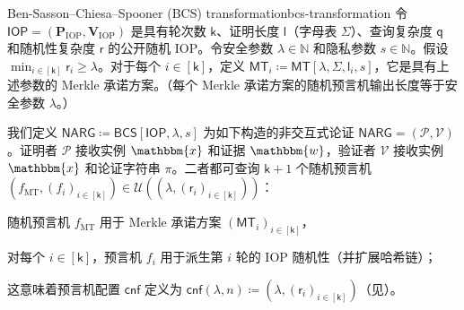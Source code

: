 \documentclass[american,singlepageview]{snargs-book-zh}
\newcommand{\DefineEqual}{\coloneqq}
\newcommand{\Naturals}{\mathbb{N}}
\newcommand{\Instance}{\mathbbm{x}}
\newcommand{\Witness}{\mathbbm{w}}
\newcommand{\InstanceSize}{n}
\newcommand{\ProtoProver}{P}
\newcommand{\ProtoVerifier}{V}
\newcommand{\ProtoAlphabet}{\Sigma}
\newcommand{\ProtoRoundComplexity}{\mathsf{k}}
\newcommand{\ProtoProofLength}{\mathsf{l}}
\newcommand{\ProtoQueryComplexity}{\mathsf{q}}
\newcommand{\ProtoRandomnessComplexity}{\mathsf{r}}
\newcommand{\RoundIndex}{i}
\newcommand{\IOPSymbol}{\mathsf{IOP}}
\newcommand{\IOPSubscript}{\scriptscriptstyle\mathrm{IOP}}
\newcommand{\IOPFormat}[1]{\mathbf{#1}}
\newcommand{\IOPProver}{\IOPFormat{\ProtoProver}_{\IOPSubscript}}
\newcommand{\IOPVerifier}{\IOPFormat{\ProtoVerifier}_{\IOPSubscript}}
\newcommand{\IOPSystem}{(\IOPProver,\IOPVerifier)}
\newcommand{\IOPRoundComplexity}{\ProtoRoundComplexity}
\newcommand{\IOPAlphabet}{\ProtoAlphabet}
\newcommand{\IOPProofLength}{\ProtoProofLength}
\newcommand{\IOPRandomnessComplexity}{\ProtoRandomnessComplexity}
\newcommand{\IOPQueryComplexity}{\ProtoQueryComplexity}
\newcommand{\IOPTuple}[1]{(#1_{\RoundIndex})_{\RoundIndex \in [\IOPRoundComplexity]}}
\newcommand{\NARGSymbol}{\mathsf{NARG}}
\newcommand{\ARGFormat}[1]{\mathcal{#1}}
\newcommand{\ARGOracles}{\mathsf{cnf}}
\newcommand{\ARGProver}{\ARGFormat{\ProtoProver}}
\newcommand{\ARGVerifier}{\ARGFormat{\ProtoVerifier}}
\newcommand{\ARGSystem}{(\ARGProver,\ARGVerifier)}
\newcommand{\ARGString}{\pi}
\newcommand{\ROFunction}{f}
\newcommand{\RODistribution}[1]{\mathcal{U}(#1)}
\newcommand{\SecurityParameter}{\lambda}
\newcommand{\PrivacyParameter}{s}
\newcommand{\ROTreeSymbol}{\MTSubscript}
\newcommand{\ROTreeFunction}{\ROFunction_{\ROTreeSymbol}}
\newcommand{\RORandRoundFunction}[1]{\ROFunction_{#1}}
\newcommand{\MTSymbol}{\mathsf{MT}}
\newcommand{\MTSubscript}{{\scriptscriptstyle\mathrm{MT}}}
\newcommand{\MTConstructor}[4]{\MTSymbol[#1,#2,#3,#4]}
\newcommand{\FormatTransName}[1]{\bm{\mathsf{#1}}}
\newcommand{\BCSSymbol}{\FormatTransName{BCS}}
\newcommand{\FormatTransInputs}[3]{[#1,#2,#3]}
\newcommand{\BCSTransformation}[3]{\BCSSymbol\FormatTransInputs{#1}{#2}{#3}}
\newcommand{\BCSText}{Ben-Sasson--Chiesa--Spooner (BCS) transformation\xspace}
\begin{document}
\begin{ImportantConstruction}{\BCSText}{bcs-transformation}
令 $\IOPSymbol=\IOPSystem$ 是具有轮次数 $\IOPRoundComplexity$、证明长度 $\IOPProofLength$（字母表 $\IOPAlphabet$）、查询复杂度 $\IOPQueryComplexity$ 和随机性复杂度 $\IOPRandomnessComplexity$ 的公开随机 IOP。令安全参数 $\SecurityParameter \in \Naturals$ 和隐私参数 $\PrivacyParameter \in \Naturals$。假设 $\min_{\RoundIndex \in [\IOPRoundComplexity]} \IOPRandomnessComplexity_{\RoundIndex} \geq \SecurityParameter$。对于每个 $\RoundIndex \in [\IOPRoundComplexity]$，定义 $\MTSymbol_{\RoundIndex} \DefineEqual \MTConstructor{\SecurityParameter}{\IOPAlphabet}{\IOPProofLength_{\RoundIndex}}{\PrivacyParameter}$，它是具有上述参数的 Merkle 承诺方案。（每个 Merkle 承诺方案的随机预言机输出长度等于安全参数 $\SecurityParameter$。）

我们定义 $\NARGSymbol \DefineEqual \BCSTransformation{\IOPSymbol}{\SecurityParameter}{\PrivacyParameter}$ 为如下构造的非交互式论证 $\NARGSymbol=\ARGSystem$。证明者 $\ARGProver$ 接收实例 $\Instance$ 和证据 $\Witness$，验证者 $\ARGVerifier$ 接收实例 $\Instance$ 和论证字符串 $\ARGString$。二者都可查询 $\IOPRoundComplexity+1$ 个随机预言机
$(\ROTreeFunction, (\RORandRoundFunction{\RoundIndex})_{\RoundIndex \in [\IOPRoundComplexity]}) \in \RODistribution{(\SecurityParameter,\IOPTuple{\IOPRandomnessComplexity})}$：
\begin{inparaenum}[(a)]
  \item 随机预言机 $\ROTreeFunction$ 用于 Merkle 承诺方案 $\IOPTuple{\MTSymbol}$，
  \item 对每个 $\RoundIndex \in [\IOPRoundComplexity]$，预言机 $\RORandRoundFunction{\RoundIndex}$ 用于派生第 $\RoundIndex$ 轮的 IOP 随机性（并扩展哈希链）；
\end{inparaenum}
这意味着预言机配置 $\ARGOracles$ 定义为 $\ARGOracles(\SecurityParameter,\InstanceSize) \DefineEqual (\SecurityParameter,\IOPTuple{\IOPRandomnessComplexity})$（见）。
\begin{itemize}


\end{itemize}
\end{ImportantConstruction}
\end{document}
